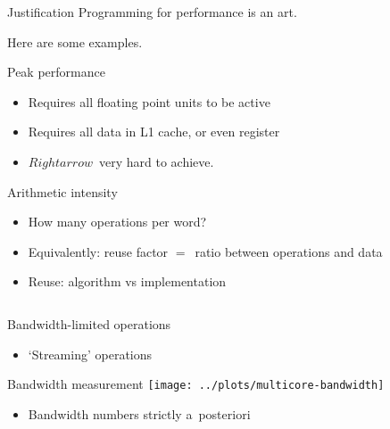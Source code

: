 
\begin{numberedframe}{Justification}
  Programming for performance is an art.

  Here are some examples.
\end{numberedframe}

\begin{numberedframe}{Peak performance}
  \begin{itemize}
  \item Requires all floating point units to be active
  \item Requires all data in L1 cache, or even register
  \item $Rightarrow$~very hard to achieve.
  \end{itemize}
\end{numberedframe}

\begin{numberedframe}{Arithmetic intensity}
  \begin{itemize}
  \item How many operations per word?
  \item Equivalently: reuse factor $=$~ratio between operations and data
  \item Reuse: algorithm vs implementation
  \end{itemize}
\begin{lstlisting}
\end{lstlisting}
\end{numberedframe}

\begin{numberedframe}{Bandwidth-limited operations}
  \begin{itemize}
  \item `Streaming' operations
  \end{itemize}
\end{numberedframe}

\begin{numberedframe}{Bandwidth measurement}
\texttt{[image: ../plots/multicore-bandwidth]}
  \begin{itemize}
  \item Bandwidth numbers strictly a~posteriori
  \end{itemize}
\end{numberedframe}

